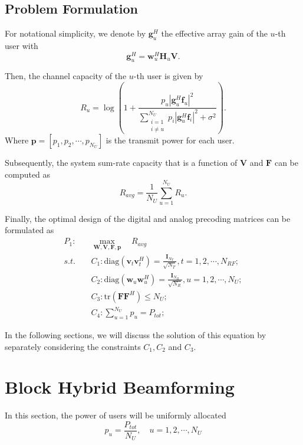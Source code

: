 \documentclass[conference]{IEEEtran}
\begin{document}
\subsection{Problem Formulation}
For notational simplicity, we denote by ${\bm{g}}_{u}^H$ the effective array gain of the $u$-th user with
\begin{equation}\label{eq:defgu}
{\bm{g}}_{u}^H = \bm{w}^H_u \bm{H}_u \bm{V}.
\end{equation}

Then, the channel capacity of the $u$-th user is given by
\begin{equation}\label{eq:convenR}
R_u = \log\left(1+\frac{p_u|{\bm{g}}_{u}^H \bm{f}_u|^2}{\sum_{\substack{i=1 \\ i\neq u}}^{N_U}p_i|{\bm{g}}_{u}^H\bm{f}_i|^2+\sigma^2}\right).
\end{equation}
Where $\bm{p}=[p_1,p_2,\cdots,p_{N_U}]$ is the transmit power for each user.

Subsequently, the system sum-rate capacity that is a function of ${\bm V}$ and ${\bm F}$ can be computed as
\begin{equation}
R_{avg}=\frac{1}{N_U}\sum_{u=1}^{N_U}R_u.
\end{equation}


Finally, the optimal design of the digital and analog precoding matrices can be formulated as
\begin{align}\label{eq:maxsumrate}
P_1: \quad&\max_{\bm W, \bm V,\bm F, \bm{p}}\quad R_{avg}\\ \nonumber
s.t. \quad&C_1: \text{diag}(\bm{v}_t\bm{v}_t^H)=\frac{\bm{I}_{N_T}}{\sqrt{N_T}}, t =1,2,\cdots, N_{RF};\\
&C_2: \text{diag}(\bm{w}_u\bm{w}_u^H)=\frac{\bm{I}_{N_{R}}}{\sqrt{N_R}}, u = 1,2,\cdots,N_U;\nonumber\\
&C_3: \text{tr}(\bm{FF}^H) \leq N_U;\nonumber\\
& C_4: \sum_{u=1}^{N_U} p_u = P_{tot};\nonumber
\end{align}

In the following sections, we will discuss the solution of this equation by separately considering the constraints $C_1,C_2$ and $C_3$.

\section{Block Hybrid Beamforming}
In this section, the power of users will be uniformly allocated
\begin{equation}
	p_u = \frac{P_{tot}}{N_U}, \quad u = 1,2,\cdots, N_U
\end{equation}
\end{document}

